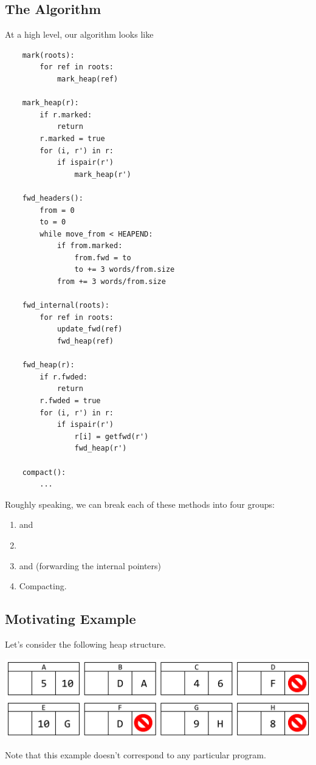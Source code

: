 \documentclass[letterpaper]{article}
\begin{document}
\subsection{The Algorithm}
At a high level, our algorithm looks like 
\begin{verbatim}
    mark(roots):
        for ref in roots:
            mark_heap(ref)
    
    mark_heap(r):
        if r.marked:
            return 
        r.marked = true 
        for (i, r') in r:
            if ispair(r')
                mark_heap(r')

    fwd_headers():
        from = 0
        to = 0
        while move_from < HEAPEND:
            if from.marked: 
                from.fwd = to 
                to += 3 words/from.size 
            from += 3 words/from.size 
    
    fwd_internal(roots):
        for ref in roots:
            update_fwd(ref)
            fwd_heap(ref)

    fwd_heap(r):
        if r.fwded: 
            return 
        r.fwded = true 
        for (i, r') in r:
            if ispair(r')
                r[i] = getfwd(r')
                fwd_heap(r')

    compact():
        ... \end{verbatim}
Roughly speaking, we can break each of these methods into four groups: 
\begin{enumerate}
    \item {} and 
    \item {}
    \item {} and  (forwarding the internal pointers)
    \item Compacting.
\end{enumerate}

\subsection{Motivating Example}
Let's consider the following heap structure.
\begin{center}
    \includegraphics[scale=0.8]{../assets/GCAlg1.png}
\end{center}
Note that this example doesn't correspond to any particular program. 
\end{document}
